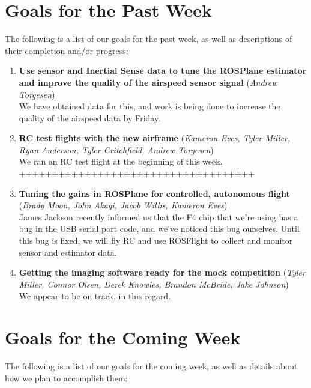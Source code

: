 \documentclass[]{../auvsi_doc}
\begin{document}
\section{Goals for the Past Week}

The following is a list of our goals for the past week, as well as descriptions of their completion and/or progress:

\begin{enumerate}
	\item \textbf{Use sensor and Inertial Sense data to tune the ROSPlane estimator and improve the quality of the airspeed sensor signal} (\textit{Andrew Torgesen})\\
	We have obtained data for this, and work is being done to increase the quality of the airspeed data by Friday.
	\item \textbf{RC test flights with the new airframe} (\textit{Kameron Eves, Tyler Miller, Ryan Anderson, Tyler Critchfield, Andrew Torgesen})\\
	We ran an RC test flight at the beginning of this week. ++++++++++++++++++++++++++++++++++++
	\item \textbf{Tuning the gains in ROSPlane for controlled, autonomous flight} (\textit{Brady Moon, John Akagi, Jacob Willis, Kameron Eves})\\
	James Jackson recently informed us that the F4 chip that we're using has a bug in the USB serial port code, and we've noticed this bug ourselves. Until this bug is fixed, we will fly RC and use ROSFlight to collect and monitor sensor and estimator data.
	\item \textbf{Getting the imaging software ready for the mock competition} (\textit{Tyler Miller, Connor Olsen, Derek Knowles, Brandon McBride, Jake Johnson})\\
	We appear to be on track, in this regard.
\end{enumerate}

\section{Goals for the Coming Week}

The following is a list of our goals for the coming week, as well as details about how we plan to accomplish them:
\end{document}

